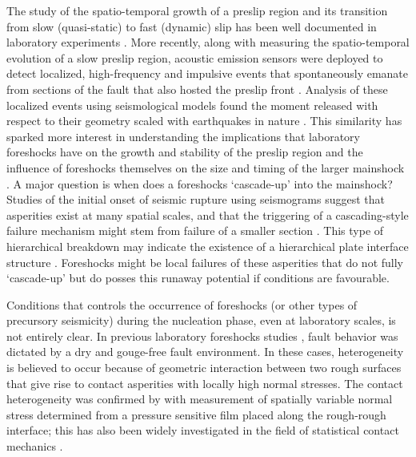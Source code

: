 \documentclass[preprint,1p, 10pt,authoryear]{elsarticle}
\begin{document}
The study of the spatio-temporal growth of a preslip region  and its transition from slow (quasi-static) to fast (dynamic) slip has been well documented in laboratory experiments \citep{Dieterich1978,Okubo1984, Ohnaka1999, Nielsen2010, Latour2013, Fukuyama2018, Zhuo2018, Ke2018, Buijze2020}. More recently, along with measuring the spatio-temporal evolution of a slow preslip region, acoustic emission sensors were deployed to detect localized, high-frequency and impulsive events that spontaneously emanate from sections of the fault that also hosted the preslip front \citep{Ma2002, McLaskey2013, Selvadurai2015,Passelegue2017, Zhuo2018a}.  Analysis of these localized events using seismological models found the moment released with respect to their geometry scaled with earthquakes in nature \citep{McLaskey2014, Selvadurai2019}. This similarity has sparked more interest in understanding the implications that laboratory foreshocks have on the growth and stability of the preslip region and the influence of foreshocks themselves on the size and timing of the larger mainshock \citep{McLaskey2019}.  A major question is when does a foreshocks `cascade-up' into the mainshock? Studies of the initial onset of seismic rupture using seismograms suggest that asperities exist at many spatial scales, and that the triggering of a cascading-style failure mechanism might stem from failure of a smaller section \citep{Okuda2018, Ide2019}. This type of hierarchical breakdown may indicate the existence of a hierarchical plate interface structure \citep{Ide2005, Aochi2014, Aochi2017}.  Foreshocks might be local failures of these asperities that do not fully `cascade-up' but do posses this runaway potential if conditions are favourable. 

Conditions that controls the occurrence of foreshocks (or other types of precursory seismicity) during the nucleation phase, even at laboratory scales, is not entirely clear. In previous laboratory foreshocks studies \citep{McLaskey2013, Selvadurai2015}, fault behavior was dictated by a dry and gouge-free fault environment.  In these cases, heterogeneity is believed to occur because of geometric interaction between two rough surfaces that give rise to contact asperities with locally high normal stresses.  The contact heterogeneity was confirmed by \citet{Selvadurai2017} with measurement of spatially variable normal stress determined from a pressure sensitive film placed along the rough-rough interface; this has also been widely investigated in the field of statistical contact mechanics \citep[e.g.][]{Greenwood1966,Johnson1985, Persson2006}. 
\end{document}
